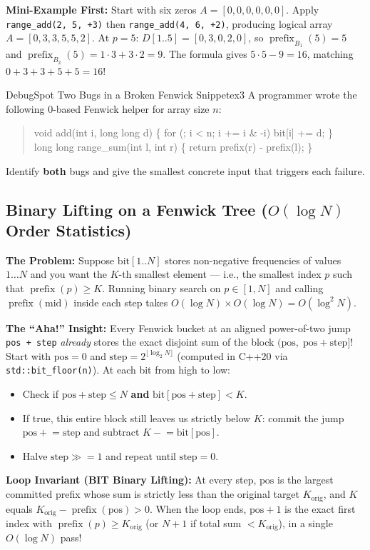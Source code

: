\documentclass[11pt,a4paper]{article}
\theoremstyle{definition}
\newcommand{\painbeat}{\textbf{\color{accentamber}The Problem:} }
\newcommand{\ahabeat}{\textbf{\color{accentteal}The ``Aha!'' Insight:} }
\newcommand{\examplebeat}{\textbf{\color{primaryblue}Mini-Example First:} }
\newcommand{\invariantbeat}[1]{\par\noindent\textbf{\color{accentteal}Loop Invariant (#1):} }
\begin{document}
\examplebeat Start with six zeros $A = [0, 0, 0, 0, 0, 0]$. Apply \texttt{range\_add(2, 5, +3)} then \texttt{range\_add(4, 6, +2)}, producing logical array $A = [0, 3, 3, 5, 5, 2]$. At $p = 5$: $D[1..5] = [0, 3, 0, 2, 0]$, so $\operatorname{prefix}_{B_1}(5) = 5$ and $\operatorname{prefix}_{B_2}(5) = 1 \cdot 3 + 3 \cdot 2 = 9$. The formula gives $5 \cdot 5 - 9 = 16$, matching $0 + 3 + 3 + 5 + 5 = 16$!

\begin{tryitbox}{Debug}{Spot Two Bugs in a Broken Fenwick Snippet}{ex3}
A programmer wrote the following $0$-based Fenwick helper for array size $n$:
\begin{quote}\ttfamily\small
void add(int i, long long d) \{ for (; i < n; i += i \& -i) bit[i] += d; \}\\
long long range\_sum(int l, int r) \{ return prefix(r) - prefix(l); \}
\end{quote}
Identify \textbf{both} bugs and give the smallest concrete input that triggers each failure.
\end{tryitbox}

\subsection{Binary Lifting on a Fenwick Tree (\texorpdfstring{$O(\log N)$}{O(log N)} Order Statistics)}

\painbeat Suppose $\text{bit}[1..N]$ stores non-negative frequencies of values $1 \dots N$ and you want the $K$-th smallest element --- i.e., the smallest index $p$ such that $\operatorname{prefix}(p) \ge K$. Running binary search on $p \in [1, N]$ and calling $\operatorname{prefix}(\text{mid})$ inside each step takes $O(\log N) \times O(\log N) = O(\log^2 N)$.

\ahabeat Every Fenwick bucket at an aligned power-of-two jump \texttt{pos + step} \emph{already} stores the exact disjoint sum of the block $(\text{pos},\; \text{pos} + \text{step}]$! Start with $\text{pos} = 0$ and $\text{step} = 2^{\lfloor \log_2 N \rfloor}$ (computed in C++20 via \texttt{std::bit\_floor(n)}). At each bit from high to low:
\begin{itemize}[itemsep=2pt, topsep=2pt]
    \item Check if $\text{pos} + \text{step} \le N$ \textbf{and} $\text{bit}[\text{pos} + \text{step}] < K$.
    \item If true, this entire block still leaves us strictly below $K$: commit the jump $\text{pos} \mathrel{+}= \text{step}$ and subtract $K \mathrel{-}= \text{bit}[\text{pos}]$.
    \item Halve $\text{step} \gg= 1$ and repeat until $\text{step} = 0$.
\end{itemize}
\invariantbeat{BIT Binary Lifting} At every step, $\text{pos}$ is the largest committed prefix whose sum is strictly less than the original target $K_{\text{orig}}$, and $K$ equals $K_{\text{orig}} - \operatorname{prefix}(\text{pos}) > 0$. When the loop ends, $\text{pos} + 1$ is the exact first index with $\operatorname{prefix}(p) \ge K_{\text{orig}}$ (or $N + 1$ if total sum $< K_{\text{orig}}$), in a single $O(\log N)$ pass!
\end{document}
